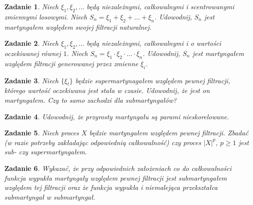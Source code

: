 \documentclass[12pt]{article}
\newtheorem{zd}{Zadanie}
\begin{document}
\begin{zd}
	Niech $\xi_1, \xi_2, \dots$ będą niezależnymi, całkowalnymi i scentrowanymi zmiennymi losowymi. Niech $S_n = \xi_1 + \xi_2 + \dots + \xi_n$. Udowodnij, $S_n$ jest martyngałem względem swojej filtracji naturalnej.
\end{zd}
\begin{zd}
	Niech $\xi_1, \xi_2, \dots$ będą niezależnymi, całkowalnymi i o wartości oczekiwanej równej $1$. Niech $S_n = \xi_1 \cdot \xi_2 \cdot \dots \cdot \xi_n$. Udowodnij, $S_n$ jest martyngałem względem filtracji generowanej przez zmienne $\xi_i$.
\end{zd}
\begin{zd}
	Niech $\{\xi_t\}$ będzie supermartynagałem względem pewnej filtracji, którego wartość oczekiwana jest stała w czasie. Udowodnij, że jest on martyngałem. Czy to samo zachodzi dla submartyngałów?
\end{zd}
\begin{zd}
	Udowodnij, że przyrosty martyngału są parami nieskorelowane.
\end{zd}
\begin{zd}
	Niech proces $X$ będzie martyngałem względem pewnej filtracji. Zbadać (w razie potrzeby zakładając odpowiednią całkowalność) czy proces $|X|^p,\ p \geq 1$ jest sub- czy supermartyngałem.
\end{zd}
\begin{zd}
	Wykazać, że przy odpowiednich założeniach co do całkowalności funkcja wypukła martyngały względem pewnej filtracji jest submartyngałem względem tej filtracji oraz że funkcja wypukła i niemalejąca przekształca submartyngał w submartyngał.
\end{zd}
\end{document}

